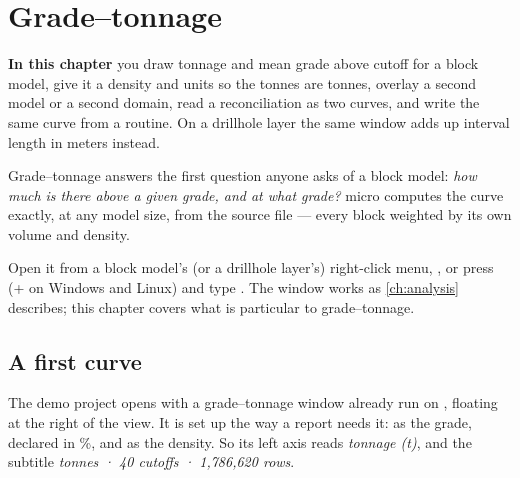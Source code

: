 \chapter{Grade–tonnage}\label{ch:gt}
\begin{goals}
\textbf{In this chapter} you draw tonnage and mean grade above cutoff for a block model, give it a density and units so the tonnes are tonnes, overlay a second model or a second domain, read a reconciliation as two curves, and write the same curve from a routine. On a drillhole layer the same window adds up interval length in meters instead.
\end{goals}

Grade–tonnage answers the first question anyone asks of a block model: \emph{how much is there above a given grade, and at what grade?} micro computes the curve exactly, at any model size, from the source file — every block weighted by its own volume and density.

Open it from a block model's (or a drillhole layer's) right-click menu, , or press  (+ on Windows and Linux) and type . The window works as \cref{ch:analysis} describes; this chapter covers what is particular to grade–tonnage.

\section{A first curve}\label{sec:gt-first}
The demo project opens with a grade–tonnage window already run on , floating at the right of the view. It is set up the way a report needs it:  as the grade, declared in \%, and  as the density. So its left axis reads \emph{tonnage (t)}, and the subtitle \emph{tonnes · 40 cutoffs · 1,786,620 rows}.

